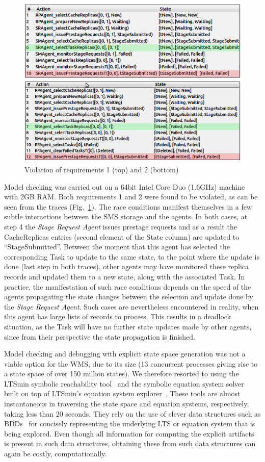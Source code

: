 \documentclass[sort&compress,preprint,3p]{elsarticle}
\begin{document}
\begin{figure}[tp]
\includegraphics[width=0.7\linewidth,keepaspectratio=true]{./Figure9.png}
\centering
\caption{Violation of requirements 1 (top) and 2 (bottom)}
\label{fig:PropertyViolation}
\end{figure}
Model checking was carried out on a 64bit Intel Core Duo (1.6GHz) machine with 2GB RAM. 
Both requirements 1 and 2 were found to be violated, as can be seen from the traces (Fig.~\ref{fig:PropertyViolation}).
The race conditions manifest themselves in a few subtle interactions between the SMS storage and the agents.
In both cases, at step 4 the \textit{Stage Request Agent} issues prestage requests and 
as a result the CacheReplicas entries (second element of the State column) are updated to ``StageSubmitted''. Between the moment
that this agent has selected the corresponding Task to update to the same state,
to the point where the update is done (last step in both traces),
other agents may have monitored these replica records and updated
them to a new state, along with the associated Task. In practice, the manifestation
of such race conditions depends on the speed of the agents propagating the
state changes between the selection and update done by the \textit{Stage Request Agent}.
Such cases are nevertheless encountered in reality, when this agent
has large lists of records to process. This results in a deadlock situation, as 
the Task will have no further state updates made by other agents, since
from their perspective the state propagation is finished.

Model checking and debugging with explicit state space generation was not
a viable option for the WMS, due to its size (13 concurrent processes
giving rise to a state space of over 150 million states). We therefore
resorted to using the LTSmin symbolic reachability tool~\cite{BP:08} and
the symbolic equation system solver built on top of LTSmin's equation
system explorer~\cite{KP:12}.  These tools are almost instantaneous
in traversing the state space and equation systems, respectively,
taking less than 20 seconds. They rely on the use of clever data
structures such as BDDs~\cite{BCMDH:90} for concisely representing the
underlying LTS or equation system that is being explored. Even though
all information for computing the explicit artifacts is present in such
data structures,  obtaining these from such data structures can again
be costly, computationally.
\end{document}
